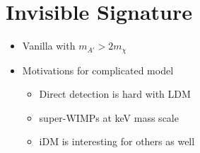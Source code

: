\section{Invisible Signature}
\begin{itemize}
    \item Vanilla with $m_{A'} > 2m_\chi$
\end{itemize}

\begin{itemize}
    \item Motivations for complicated model
          \begin{itemize}
              \item Direct detection is hard with LDM \cite{ldmconstraints-2019}
              \item super-WIMPs at keV mass scale \cite{superwimps-2008}
              \item iDM is interesting for others as well \cite{darkseaquest-2018}
          \end{itemize}
\end{itemize}

